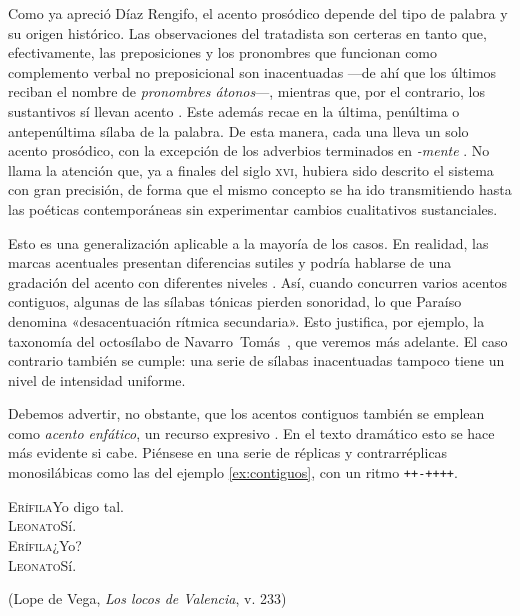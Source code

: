 Como ya apreció Díaz Rengifo, el acento prosódico depende del tipo de palabra y su origen histórico. Las observaciones del tratadista son certeras en tanto que, efectivamente, las preposiciones y los pronombres que funcionan como complemento verbal no preposicional son inacentuadas —de ahí que los últimos reciban el nombre de \textit{pronombres átonos}—, mientras que, por el contrario, los sustantivos sí llevan acento \parencite[22-26]{quilis2013}. Este además recae en la última, penúltima o antepenúltima sílaba de la palabra. De esta manera, cada una lleva un solo acento prosódico, con la excepción de los adverbios terminados en \textit{-mente} \parencite{quilis2013}. No llama la atención que, ya a finales del siglo \textsc{xvi}, hubiera sido descrito el sistema con gran precisión, de forma que el mismo concepto se ha ido transmitiendo hasta las poéticas contemporáneas sin experimentar cambios cualitativos sustanciales.

Esto es una generalización aplicable a la mayoría de los casos. En realidad, las marcas acentuales presentan diferencias sutiles y podría hablarse de una gradación del acento con diferentes niveles \parencite[173]{navarrotomas2004}. Así, cuando concurren varios acentos contiguos, algunas de las sílabas tónicas pierden sonoridad, lo que Paraíso \parencite[81]{paraiso2000} denomina «desacentuación rítmica secundaria». Esto justifica, por ejemplo, la taxonomía del octosílabo de Navarro~Tomás~\parencite*[p. 64 y ss.]{navarrotomas2014a}, que veremos más adelante. El caso contrario también se cumple: una serie de sílabas inacentuadas tampoco tiene un nivel de intensidad uniforme.

Debemos advertir, no obstante, que los acentos contiguos también se emplean como \textit{acento enfático}, un recurso expresivo \parencite[83-84]{paraiso2000}. En el texto dramático esto se hace más evidente si cabe. Piénsese en una serie de réplicas y contrarréplicas monosilábicas como las del ejemplo \ref{ex:contiguos}, con un ritmo \texttt{++-++++}.

\begin{exe}
	\ex\label{ex:contiguos}\textsc{Erífila}\hspace{1cm}Yo digo tal.\\
	\textsc{Leonato}\hspace{2cm}Sí.\\
	\textsc{Erífila}\hspace{3cm}¿Yo?\\
	\textsc{Leonato}\hspace{4cm}Sí.\\
	\strut\hfill(Lope de Vega, \nocite{vegavalencia}\textit{Los locos de Valencia}, v. 233)
\end{exe}

